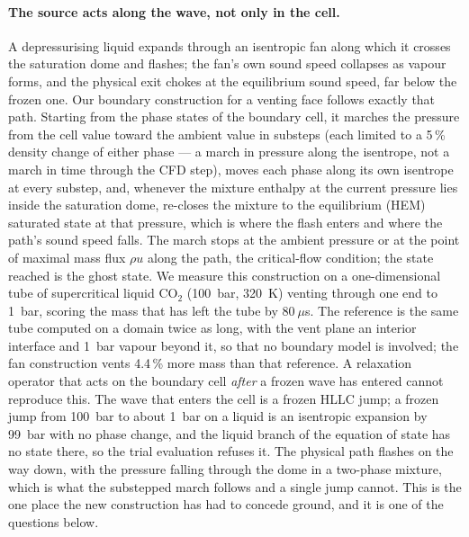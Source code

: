 \documentclass[11pt,a4paper]{article}
\begin{document}
\paragraph{The source acts along the wave, not only in the cell.}  A
depressurising liquid expands through an isentropic fan along which it
crosses the saturation dome and flashes; the fan's own sound speed
collapses as vapour forms, and the physical exit chokes at the
equilibrium sound speed, far below the frozen one.  Our boundary
construction for a venting face follows exactly that path.  Starting
from the phase states of the boundary cell, it marches the pressure
from the cell value toward the ambient value in substeps (each limited
to a 5\,\% density change of either phase --- a march in pressure along
the isentrope, not a march in time through the CFD step), moves each
phase along its own isentrope at every substep, and, whenever the
mixture enthalpy at the current pressure lies inside the saturation
dome, re-closes the mixture to the equilibrium (HEM) saturated state at
that pressure, which is where the flash enters and where the path's
sound speed falls.  The march stops at the ambient pressure or at the
point of maximal mass flux $\rho u$ along the path, the critical-flow
condition; the state reached is the ghost state.  We measure this
construction on a one-dimensional tube of supercritical liquid CO$_2$
(100~bar, 320~K) venting through one end to 1~bar, scoring the mass
that has left the tube by $80~\mu$s.  The reference is the same tube
computed on a domain twice as long, with the vent plane an interior
interface and 1~bar vapour beyond it, so that no boundary model is
involved; the fan construction vents 4.4\,\% more mass than that
reference.  A relaxation operator that acts on the boundary cell
\emph{after} a frozen wave has entered cannot reproduce this.  The wave
that enters the cell is a frozen HLLC jump; a frozen jump from 100~bar
to about 1~bar on a liquid is an isentropic expansion by 99~bar with no
phase change, and the liquid branch of the equation of state has no
state there, so the trial evaluation refuses it.  The physical path
flashes on the way down, with the pressure falling through the dome in
a two-phase mixture, which is what the substepped march follows and a
single jump cannot.  This is the one place the new construction has had
to concede ground, and it is one of the questions below.
\end{document}
